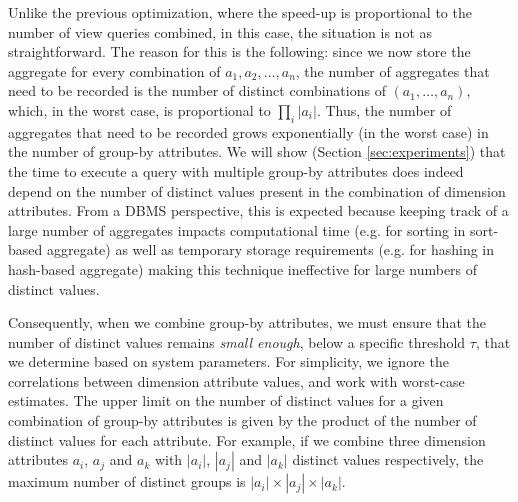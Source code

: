 Unlike the previous optimization, where the speed-up is proportional to the
number of view queries combined, in this case, the situation is not as straightforward. 
The reason for this is the following:
since we now store the aggregate for every combination
of $a_1, a_2, \ldots, a_n$, 
the number of aggregates that need to be recorded 
is the number of distinct combinations
of $(a_1, \ldots, a_n)$, which, in the worst case, 
is proportional to $\prod_i |a_i|$.
Thus, the number of aggregates that need to be recorded 
grows exponentially (in the worst case) in the
number of group-by attributes. 
We will show (Section \ref{sec:experiments}) that 
the time to execute a query with multiple group-by attributes does indeed
depend on the number of distinct values present in the 
combination of dimension attributes. 
From a DBMS perspective, this is expected because keeping track of a large
number of aggregates impacts computational time (e.g. for sorting in sort-based aggregate)
as well as temporary storage requirements (e.g. for hashing in hash-based
aggregate) making this technique ineffective for large numbers of
distinct values.

Consequently, when we combine group-by attributes, we must ensure that the
number of distinct values remains {\it small enough}, below a specific 
threshold $\tau$, that we determine based on system parameters.
For simplicity, we ignore the correlations between dimension attribute values,
and work with worst-case estimates. 
The upper limit on the number of distinct values for a given combination of
group-by attributes is given by the product of the number of distinct values
for each attribute.
For example, if we combine three dimension attributes $a_i$, $a_j$ and $a_k$
with $|a_i|$, $|a_j|$ and $|a_k|$ distinct values respectively, the maximum number of
distinct groups is $|a_i|\times |a_j| \times |a_k|$.
  
